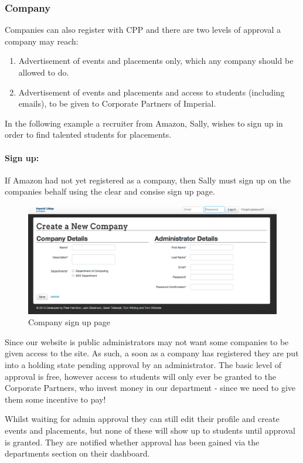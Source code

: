 \subsubsection{Company}
Companies can also register with CPP and there are two levels of approval a company may reach:
  \begin{enumerate}
    \item Advertisement of events and placements only, which any company should be allowed to do.
    \item Advertisement of events and placements and access to students (including emails), to be given to Corporate Partners of Imperial.
  \end{enumerate} 
  In the following example a recruiter from Amazon, Sally, wishes to sign up in order to find talented students for placements.
  \paragraph{Sign up:}
    If Amazon had not yet registered as a company, then Sally must sign up on the companies behalf using the clear and consise sign up page.

    \begin{figure}[H]\centering
    \includegraphics[scale=0.3]{images/user_experiences/company/company_signup}
    \caption{Company sign up page}
    \end{figure}

    Since our website is public administrators may not want some companies to be given access to the site. As such, a soon as a company has registered they are put into a holding state pending approval by an administrator.
    The basic level of approval is free, however access to students will only ever be granted to the Corporate Partners, who invest money in our department - since we need to give them some incentive to pay!

    Whilst waiting for admin approval they can still edit their profile and create events and placements, but none of these will show up to students until approval is granted. They are notified whether approval has been gained via the departments section on their dashboard.

